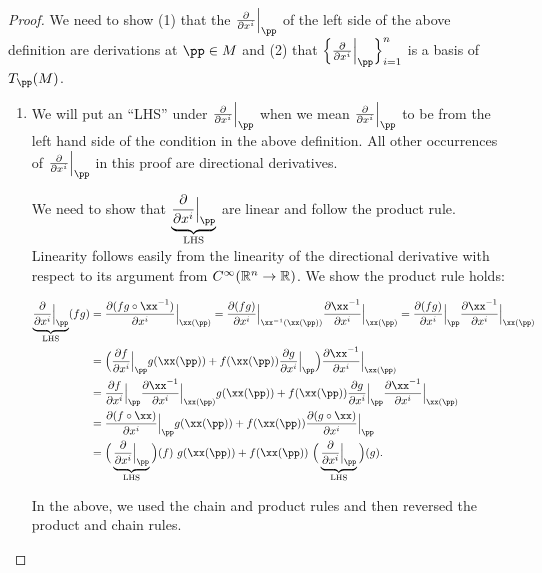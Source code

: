 \begin{proof}
    \newcommand{\pdxiLHS}{\underbrace{\frac{\pd}{\pd x^i}\Big|_\pp}_{\text{LHS}}}

    We need to show (1) that the $\frac{\pd}{\pd x^i}\Big|_\pp$ of the left side of the above definition are derivations at $\pp \in M$ and (2) that $\Big\{ \frac{\pd}{\pd x^i}\Big|_\pp \Big\}_{i = 1}^n$ is a basis of $T_\pp(M)$.

    \begin{enumerate}
        \item We will put an ``LHS'' under $\frac{\pd}{\pd x^i}\Big|_\pp$ when we mean $\frac{\pd}{\pd x^i}\Big|_\pp$ to be from the left hand side of the condition in the above definition. All other occurrences of $\frac{\pd}{\pd x^i}\Big|_\pp$ in this proof are directional derivatives.
    
        We need to show that $\pdxiLHS$ are linear and follow the product rule. Linearity follows easily from the linearity of the directional derivative with respect to its argument from $C^\infty(\mathbb{R}^n \rightarrow \mathbb{R})$. We show the product rule holds:
        
        \begin{align*}
           \underbrace{\frac{\pd}{\pd x^i}\Big|_\pp}_{\text{LHS}} (fg)
            &= \frac{\pd (fg \circ \xx^{-1})}{\pd x^i}\Big|_{\xx(\pp)} 
            = \frac{\pd (fg)}{\pd x^i}\Big|_{\xx^{-1}(\xx(\pp))} \frac{\pd \xx^{-1}}{\pd x^i}\Big|_{\xx(\pp)}
            = \frac{\pd (fg)}{\pd x^i}\Big|_\pp \frac{\pd \xx^{-1}}{\pd x^i}\Big|_{\xx(\pp)}
            \\
            &= \Big( \frac{\pd f}{\pd x^i}\Big|_\pp g(\xx(\pp)) + f(\xx(\pp)) \frac{\pd g}{\pd x^i}\Big|_\pp \Big) \frac{\pd \xx^{-1}}{\pd x^i}\Big|_{\xx(\pp)} \\
            &= \frac{\pd f}{\pd x^i}\Big|_\pp \frac{\pd \xx^{-1}}{\pd x^i}\Big|_{\xx(\pp)} g(\xx(\pp))
            + f(\xx(\pp)) \frac{\pd g}{\pd x^i}\Big|_\pp \frac{\pd \xx^{-1}}{\pd x^i}\Big|_{\xx(\pp)}  \\
            &= \frac{\pd (f \circ \xx)}{\pd x^i}\Big|_\pp g(\xx(\pp)) + f(\xx(\pp)) \frac{\pd (g \circ \xx)}{\pd x^i}\Big|_\pp  \\
            &= \Big( \underbrace{\frac{\pd}{\pd x^i}\Big|_\pp}_{\text{LHS}} \Big) (f) \spc g(\xx(\pp)) + f(\xx(\pp)) \spc \Big( \underbrace{\frac{\pd}{\pd x^i}\Big|_\pp}_{\text{LHS}} \Big) (g).
        \end{align*}
        
        In the above, we used the chain and product rules and then reversed the product and chain rules.


\end{enumerate}
\end{proof}
